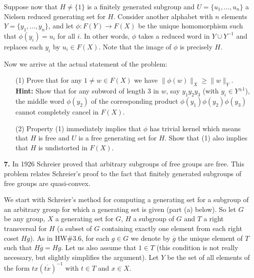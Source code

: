 \documentclass[12pt]{amsart}
\begin{document}
Suppose now that $H\neq \{1\}$ is a finitely generated subgroup and $U=\{u_1,\ldots, u_n\}$ a Nielsen reduced generating set for $H$.
Consider another alphabet with $n$ elements $Y=\{y_1,\ldots, y_n\}$, and let $\phi:F(Y)\to F(X)$ be the unique homomorphism
such that $\phi(y_i)=u_i$ for all $i$. In other words, $\phi$ takes a reduced word in $Y\cup Y^{-1}$ and replaces each $y_i$ by $u_i\in F(X)$.
Note that the image of $\phi$ is precisely $H$.

Now we arrive at the actual statement of the problem:

\begin{itemize}
\item[(1)] Prove that for any $1\neq w\in F(X)$ we have $\|\phi(w)\|_X\geq \|w\|_Y$. {\bf Hint:} Show that for any subword
of length $3$ in $w$, say $y_{1} y_2 y_3$ (with $y_i\in Y^{\pm 1}$), the middle word $\phi(y_2)$ of the corresponding
product $\phi(y_{1})\phi( y_2)\phi( y_3)$ cannot completely cancel in $F(X)$.
\item[(2)] Property (1) immediately implies that $\phi$ has trivial kernel which means that $H$ is free and $U$ is a free generating set
for $H$. Show that (1) also implies that $H$ is undistorted in $F(X)$. 
\end{itemize}

\skv


{\bf 7.} In 1926 Schreier proved that arbitrary subgroups of free groups are free. This problem relates Schreier's proof to the fact
that finitely generated subgroups of free groups are quasi-convex.

We start with Schreier's method for computing a generating set for a subgroup of an arbitrary group for which a generating set is given
(part (a) below). So let $G$ be any group, $X$ a generating set for $G$, $H$ a subgroup of $G$ and $T$ a right transversal for $H$ (a subset of $G$
containing exactly one element from each right coset $Hg$). As in HW\#3.6, for each $g\in G$ we denote by $\overline g$ the unique
element of $T$ such that $H\overline{g}=Hg$. Let us also assume that $1\in T$ (this condition is not really necessary, but
slightly simplifies the argument). Let
$Y$ be the set of all elements of the form $tx(\overline{tx})^{-1}$ with $t\in T$ and $x\in X$.
\end{document}
